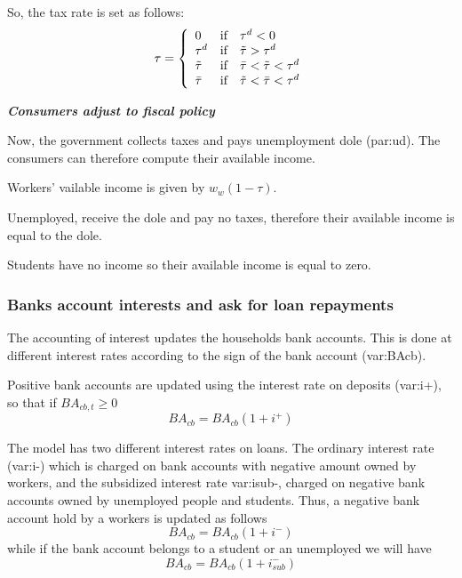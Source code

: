 \documentclass{book}
\begin{document}
So, the tax rate is set as follows:
\[
	\tau=\left\{ 
		\begin{array}{l l l}
			0& \textnormal{if} &\tau^d<0\\ 
			\tau^d& \textnormal{if} &\tilde{\tau}>\tau^d \\ 
			\tilde{\tau}& \textnormal{if} &\bar{\tau}<\tilde{\tau}<\tau^d\\ 
			\bar{\tau}& \textnormal{if} &\tilde{\tau}<\bar{\tau}<\tau^d\\ 
		\end{array}
		\right.
\]


\vskip5mm
\textit{\textbf{Consumers adjust to fiscal policy}}

Now, the government collects taxes and pays unemployment dole (\gls{par:ud}). The consumers can therefore compute their available income.

Workers' vailable income is given by $w_w(1-\tau)$.

Unemployed, receive the dole and pay no taxes, therefore their available income is equal to the dole.

Students have no income so their available income is equal to zero.

\subsubsection{Banks account interests and ask for loan repayments}

The accounting of interest updates the households bank accounts. This is done at different interest rates according to the sign of the bank account (\gls{var:BAcb}).

Positive bank accounts are updated using the interest rate on deposits (\gls{var:i+}), so that if $BA_{cb,t}\ge 0$
\[
BA_{cb}=BA_{cb}(1+i^+)
\]

The model has two different interest rates on loans. The ordinary interest rate (\gls{var:i-}) which is charged on bank accounts with negative amount owned by workers, and the subsidized interest rate \gls{var:isub-}, charged on negative bank accounts owned by unemployed people and students. Thus, a negative bank account hold by a workers is updated as follows 
\[
BA_{cb}=BA_{cb}(1+i^-)
\]
while if the bank account belongs to a student or an unemployed we will have 
\[
	BA_{cb}=BA_{cb}(1+i^-_{sub})
\]
\end{document}

